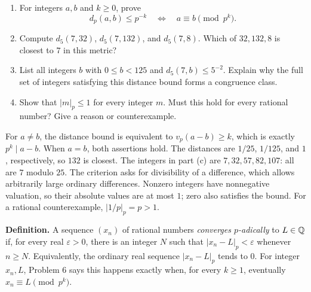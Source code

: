 \studentbreak
{}
\begin{enumerate}
 \item For integers $a,b$ and $k\ge0$, prove
 \[
 d_p(a,b)\le p^{-k}\quad\Longleftrightarrow\quad a\equiv b\pmod{p^k}.
 \]
 \item Compute $d_5(7,32)$, $d_5(7,132)$, and $d_5(7,8)$.
 Which of $32,132,8$ is closest to $7$ in this metric? 
 \item List all integers $b$ with $0\le b<125$ and $d_5(7,b)\le5^{-2}$.
 Explain why the full set of integers satisfying this distance bound
 forms a congruence class. 
 \item Show that $|m|_p\le1$ for every integer $m$.
 Must this hold for every rational number? Give a reason or counterexample.
\end{enumerate}
\begin{solution}
For $a\ne b$, the distance bound is equivalent to $v_p(a-b)\ge k$,
which is exactly $p^k\mid a-b$. When $a=b$, both assertions hold.
The distances are $1/25$, $1/125$, and $1$, respectively, so $132$ is
closest. The integers in part (c) are $7,32,57,82,107$: all are $7$ modulo
$25$. The criterion asks for divisibility of a difference, which allows
arbitrarily large ordinary differences.
Nonzero integers have nonnegative valuation, so their absolute values
are at most $1$; zero also satisfies the bound. For a rational counterexample,
$|1/p|_p=p>1$.
\end{solution}


\textbf{Definition.} A sequence $(x_n)$ of rational numbers
\emph{converges $p$-adically} to $L\in\mathbb Q$ if, for every real $\varepsilon>0$,
there is an integer $N$ such that $|x_n-L|_p<\varepsilon$ whenever $n\ge N$.
Equivalently, the ordinary real sequence $|x_n-L|_p$ tends to $0$.
For integer $x_n,L$, Problem 6 says this happens exactly when, for every
$k\ge1$, eventually $x_n\equiv L\pmod{p^k}$.


